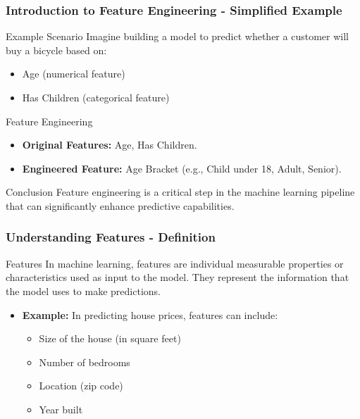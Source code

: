 \documentclass[aspectratio=169]{beamer}
\begin{document}
\begin{frame}[fragile]
    \frametitle{Introduction to Feature Engineering - Simplified Example}
    \begin{block}{Example Scenario}
        Imagine building a model to predict whether a customer will buy a bicycle based on:
        \begin{itemize}
            \item Age (numerical feature)
            \item Has Children (categorical feature)
        \end{itemize}
    \end{block}
    
    \begin{block}{Feature Engineering}
        \begin{itemize}
            \item \textbf{Original Features:} Age, Has Children.
            \item \textbf{Engineered Feature:} Age Bracket (e.g., Child under 18, Adult, Senior).
        \end{itemize}
    \end{block}
    
    \begin{block}{Conclusion}
        Feature engineering is a critical step in the machine learning pipeline that can significantly enhance predictive capabilities.
    \end{block}
\end{frame}

\begin{frame}[fragile]
    \frametitle{Understanding Features - Definition}
    \begin{block}{Features}
        In machine learning, features are individual measurable properties or characteristics used as input to the model. They represent the information that the model uses to make predictions.
    \end{block}
    
    \begin{itemize}
        \item \textbf{Example:} In predicting house prices, features can include:
        \begin{itemize}
            \item Size of the house (in square feet)
            \item Number of bedrooms
            \item Location (zip code)
            \item Year built
        \end{itemize}
    \end{itemize}
\end{frame}
\end{document}
